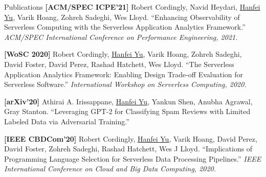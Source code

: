 \documentclass{resume} %
\begin{document}
\begin{rSection}{Publications}
\textbf{[ACM/SPEC ICPE'21]} Robert Cordingly, Navid Heydari, \underline{Hanfei Yu}, Varik Hoang, Zohreh Sadeghi, Wes Lloyd. ``Enhancing Observability of Serverless Computing with the Serverless Application Analytics Framework.'' \textit{ACM/SPEC International Conference on Performance Engineering, 2021.}

\textbf{[WoSC 2020]} Robert Cordingly, \underline{Hanfei Yu}, Varik Hoang, Zohreh Sadeghi, David Foster, David Perez, Rashad Hatchett, Wes Lloyd. ``The Serverless Application Analytics Framework: Enabling Design Trade-off Evaluation for Serverless Software.'' \textit{International Workshop on Serverless Computing, 2020.}

\textbf{[arXiv'20]} Athirai A. Irissappane, \underline{Hanfei Yu}, Yankun Shen, Anubha Agrawal, Gray Stanton. ``Leveraging GPT-2 for Classifying Spam Reviews with Limited Labeled Data via Adversarial Training.''

\textbf{[IEEE CBDCom'20]} Robert Cordingly, \underline{Hanfei Yu}, Varik Hoang, David Perez, David Foster, Zohreh Sadeghi, Rashad Hatchett, Wes J Lloyd. ``Implications of Programming Language Selection for Serverless Data Processing Pipelines.'' \textit{IEEE International Conference on Cloud and Big Data Computing, 2020.}

\end{rSection}
\end{document}
